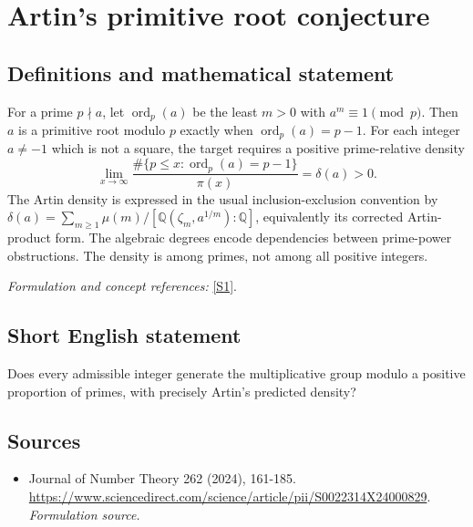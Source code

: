 \documentclass[11pt]{article}
\begin{document}
\section*{\texorpdfstring{Artin's primitive root conjecture}{Artin's primitive root conjecture}}\label{197}
\subsection{Definitions and mathematical statement}
For a prime $p\nmid a$, let $\operatorname{ord}_p(a)$ be the least $m>0$ with $a^m\equiv1\pmod p$. Then $a$ is a primitive root modulo $p$ exactly when $\operatorname{ord}_p(a)=p-1$. For each integer $a\ne-1$ which is not a square, the target requires a positive prime-relative density
\[
 \lim_{x\to\infty}\frac{\#\{p\le x:\operatorname{ord}_p(a)=p-1\}}{\pi(x)}=\delta(a)>0.
\]
The Artin density is expressed in the usual inclusion-exclusion convention by
$\delta(a)=\sum_{m\ge1}\mu(m)/[{\mathbb{Q}}(\zeta_m,a^{1/m}):{\mathbb{Q}}]$, equivalently its corrected Artin-product form. The algebraic degrees encode dependencies between prime-power obstructions. The density is among primes, not among all positive integers.
\par\smallskip\textit{Formulation and concept references:} \href{https://www.sciencedirect.com/science/article/pii/S0022314X24000829}{[S1]}.

\subsection{Short English statement}
Does every admissible integer generate the multiplicative group modulo a positive proportion of primes, with precisely Artin's predicted density?
\subsection{Sources}
\begin{itemize}
\item[S1]Journal of Number Theory 262 (2024), 161-185.
\url{https://www.sciencedirect.com/science/article/pii/S0022314X24000829}.
\textit{Formulation source.}
\end{itemize}
\end{document}
